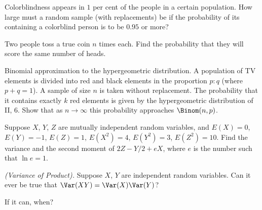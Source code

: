\begin{problem}[Handout 8, \# 14]
  Colorblindness appears in \(1\) per cent of the people in a certain
  population. How large must a random sample (with replacements) be if the
  probability of its containing a colorblind person is to be \(0.95\) or more?
\end{problem}
\begin{solution}

\end{solution}
\newpage

\begin{problem}[Handout 8, \# 15]
  Two people toss a true coin \(n\) times each. Find the probability that
  they will score the same number of heads.
\end{problem}
\begin{solution}

\end{solution}
\newpage

\begin{problem}[Handout 8, \# 16]
  Binomial approximation to the hypergeometric distribution. A population
  of TV elements is divided into red and black elements in the proportion
  \(p:q\) (where \(p+q=1\)). A sample of size \(n\) is taken without
  replacement. The probability that it contains exactly \(k\) red elements
  is given by the hypergeometric distribution of II, 6. Show that as
  \(n\to\infty\) this probability approaches \(\Binom(n,p)\).
\end{problem}
\begin{solution}

\end{solution}
\newpage

\begin{problem}[Handout 9, \# 3]
  Suppose \(X\), \(Y\), \(Z\) are mutually independent random variables,
  and \(E(X)=0\), \(E(Y)=-1\), \(E(Z)=1\), \(E(X^2)=4\), \(E(Y^2)=3\),
  \(E(Z^2)=10\). Find the variance and the second moment of \(2Z-Y/2+e X\),
  where \(e\) is the number such that \(\ln e=1\).
\end{problem}
\begin{solution}

\end{solution}
\newpage

\begin{problem}[Handout 9, \# 14]
  \emph{(Variance of Product).} Suppose \(X\), \(Y\) are independent
  random variables. Can it ever be true that \(\Var(XY)=\Var(X)\Var(Y)\)?

  \noindent If it can, when?
\end{problem}
\begin{solution}

\end{solution}


